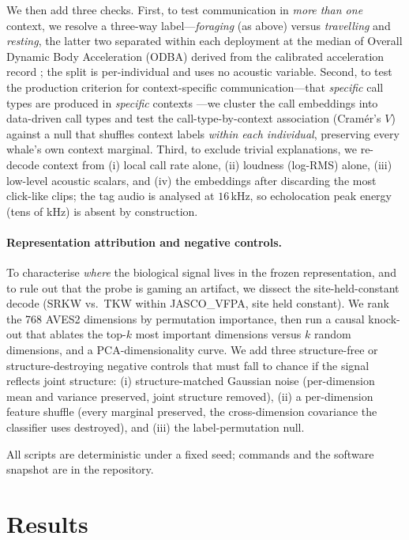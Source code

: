 \documentclass[11pt]{article}
\begin{document}
We then add three checks. First, to test communication in \emph{more than
one} context, we resolve a three-way label---\emph{foraging} (as above) versus
\emph{travelling} and \emph{resting}, the latter two separated within each deployment at the
median of Overall Dynamic Body Acceleration (ODBA) derived from the calibrated acceleration
record \citep{wilson2006}; the split is per-individual and uses no acoustic variable. Second,
to test the production criterion for context-specific communication---that \emph{specific}
call types are produced in \emph{specific} contexts \citep{ford1989,foote2008}---we cluster
the call embeddings into data-driven call types and test the call-type-by-context association
(Cram\'er's $V$) against a null that shuffles context labels \emph{within each individual},
preserving every whale's own context marginal. Third, to exclude trivial explanations, we
re-decode context from (i) local call rate alone, (ii) loudness (log-RMS) alone, (iii)
low-level acoustic scalars, and (iv) the embeddings after discarding the most click-like
clips; the tag audio is analysed at $16$\,kHz, so echolocation peak energy (tens of kHz) is
absent by construction.

\paragraph{Representation attribution and negative controls.} To characterise
\emph{where} the biological signal lives in the frozen representation, and to rule out
that the probe is gaming an artifact, we dissect the site-held-constant decode (SRKW
vs.\ TKW within JASCO\_VFPA, site held constant). We rank the 768 AVES2 dimensions by
permutation importance, then run a causal knock-out that ablates the top-$k$ most
important dimensions versus $k$ random dimensions, and a PCA-dimensionality curve. We add
three structure-free or structure-destroying negative controls that must fall to chance
if the signal reflects joint structure: (i) structure-matched Gaussian noise (per-dimension
mean and variance preserved, joint structure removed), (ii) a per-dimension feature shuffle
(every marginal preserved, the cross-dimension covariance the classifier uses destroyed),
and (iii) the label-permutation null.

All scripts are deterministic under a fixed seed; commands and the software snapshot are in
the repository.

\section{Results}
\end{document}
